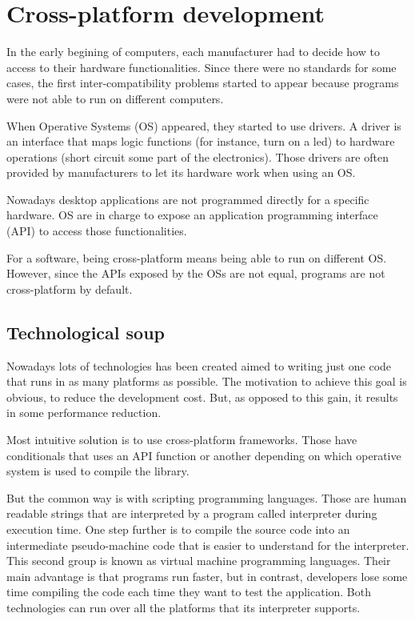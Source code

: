 \chapter{Cross-platform development}
\label{S:cp-develompent}

In the early begining of computers, each manufacturer had to decide how to access to
their hardware functionalities. Since there were no standards for some cases,
the first inter-compatibility problems started to appear because programs were
not able to run on different computers.

When Operative Systems (OS) appeared, they started to use drivers. A driver is
an interface that maps logic functions (for instance, turn on a led) to hardware
operations (short circuit some part of the electronics). Those drivers are
often provided by manufacturers to let its hardware work when using an OS.

Nowadays desktop applications are not programmed directly for a specific 
hardware. OS are in charge to expose an application programming interface (API)
to access those functionalities.

For a software, being cross-platform means being able to run on different OS. However, since the APIs
exposed by the OSs are not equal, programs are not cross-platform by default.

\section{Technological soup}

Nowadays lots of technologies has been created aimed to writing just one code
that runs in as many platforms as possible. The motivation to achieve this goal
is obvious, to reduce the development cost. But, as opposed to this gain, it
results in some performance reduction.

Most intuitive solution is to use cross-platform frameworks. Those have
conditionals that uses an API function or another depending on which operative
system is used to compile the library.

But the common way is with scripting programming languages. Those are human
readable strings that are interpreted by a program called interpreter during
execution time. One step further is to compile the source code into an
intermediate pseudo-machine code that is easier to understand for the
interpreter. This second group is known as virtual machine programming
languages. Their main advantage is that programs run faster, but in contrast,
developers lose some time compiling the code each time they want to test the
application. Both technologies can run over all the platforms that its
interpreter supports.

